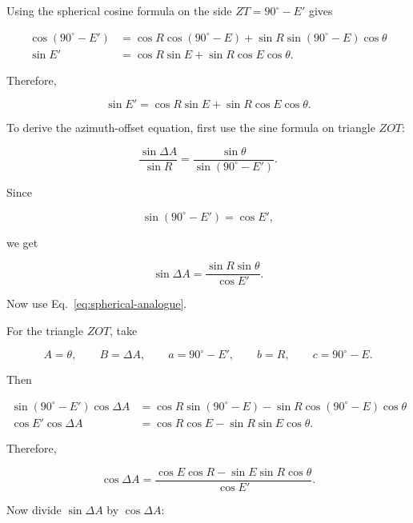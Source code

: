 \documentclass[12pt]{extarticle}
\begin{document}
Using the spherical cosine formula on the side $ZT=90^\circ-E'$ gives

\begin{align}
\cos(90^\circ-E')
&= \cos R \cos(90^\circ-E)
+ \sin R \sin(90^\circ-E)\cos\theta \\[4pt]
\sin E'
&= \cos R \sin E + \sin R \cos E \cos\theta .
\end{align}

Therefore,

\begin{equation} \boxed{\sin E' = \cos R \sin E + \sin R \cos E \cos\theta}. \end{equation}

To derive the azimuth-offset equation, first use the sine formula on triangle $ZOT$:

\begin{equation} \frac{\sin\Delta A}{\sin R} = \frac{\sin\theta}{\sin(90^\circ-E')}. \end{equation}

Since

\begin{equation} \sin(90^\circ-E') = \cos E', \end{equation}

we get

\begin{equation} \sin\Delta A = \frac{\sin R\sin\theta}{\cos E'}. \end{equation}

Now use Eq.~\eqref{eq:spherical-analogue}.

For the triangle $ZOT$, take

\begin{equation} A=\theta, \qquad B=\Delta A, \qquad a=90^\circ-E', \qquad b=R, \qquad c=90^\circ-E . \end{equation}

Then

\begin{align}
\sin(90^\circ-E')\cos\Delta A
&= \cos R\sin(90^\circ-E)
- \sin R\cos(90^\circ-E)\cos\theta \\[4pt]
\cos E'\cos\Delta A
&= \cos R\cos E - \sin R\sin E\cos\theta .
\end{align}

Therefore,

\begin{equation} \cos\Delta A = \frac{\cos E\cos R - \sin E\sin R\cos\theta}{\cos E'}. \end{equation}

Now divide $\sin\Delta A$ by $\cos\Delta A$:
\end{document}
